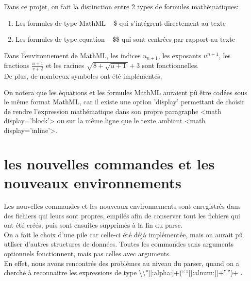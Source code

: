 \documentclass[10pt,a4paper]{report}
\begin{document}
Dans ce projet, on fait la distinction entre 2 types de formules mathématiques:
\begin{enumerate}
\item Les formules de type MathML -- \$ qui s'intégrent directement au texte
\item Les formules de type equation -- \$\$ qui sont centrées par rapport au texte
\end{enumerate}

Dans l'environnement de MathML, les indices $u_{n+1}$, les exposants $u^{n+1}$, les fractions $\frac{u+1}{v+2}$ et les racines $\sqrt{8+\sqrt{u+1}} +3$ sont fonctionnelles.
\\De plus, de nombreux symboles ont été implémentés:


On notera que les équations et les formules MathML auraient pû être codées sous le même format MathML, car il existe une option 'display' permettant de choisir de rendre l'expression mathématique dans son propre paragraphe <math display='block'> ou sur la même ligne que le texte ambiant <math display='inline'>.

\section{les nouvelles commandes et les nouveaux environnements}

Les nouvelles commandes et les nouveaux environnements sont enregistrés dans des fichiers qui leurs sont propres, empilés afin de conserver tout les fichiers qui ont été créés, puis sont ensuites supprimés à la fin du parse.\\On a fait le choix d'une pile car celle-ci été déjà implémentée, mais on aurait pû utliser d'autres structures de données.
Toutes les commandes sans arguments optionnels fonctionnent, mais pas celles avec arguments.\\En effet, nous avons rencontrés des problèmes au niveau du parser, quand on a cherché à reconnaitre les expressions de type  \textbackslash\textbackslash"[[:alpha:]+(``{``[[:alnum:]]+''}'')+ .
\end{document}
